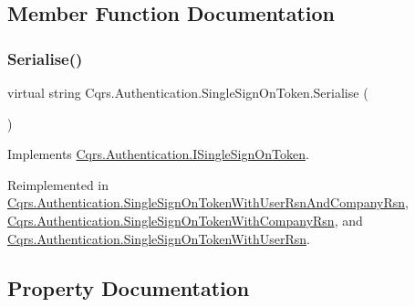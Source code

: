 \subsection{Member Function Documentation}
\mbox{\label{classCqrs_1_1Authentication_1_1SingleSignOnToken_a5e859c6c5db5aaa9ef4e8f2086df4604}} 
\subsubsection{\texorpdfstring{Serialise()}{Serialise()}}
{\footnotesize\ttfamily virtual string Cqrs.\+Authentication.\+Single\+Sign\+On\+Token.\+Serialise (\begin{DoxyParamCaption}{ }\end{DoxyParamCaption})\hspace{0.3cm}{\ttfamily [virtual]}}



Implements \hyperlink{interfaceCqrs_1_1Authentication_1_1ISingleSignOnToken_af34e8c0b052865d687064d3381bfbcdb}{Cqrs.\+Authentication.\+I\+Single\+Sign\+On\+Token}.



Reimplemented in \hyperlink{classCqrs_1_1Authentication_1_1SingleSignOnTokenWithUserRsnAndCompanyRsn_a8d44249c00e5264dc7b37f4868836a80}{Cqrs.\+Authentication.\+Single\+Sign\+On\+Token\+With\+User\+Rsn\+And\+Company\+Rsn}, \hyperlink{classCqrs_1_1Authentication_1_1SingleSignOnTokenWithCompanyRsn_a0bc9f0fae90121d029fe0730708f4210}{Cqrs.\+Authentication.\+Single\+Sign\+On\+Token\+With\+Company\+Rsn}, and \hyperlink{classCqrs_1_1Authentication_1_1SingleSignOnTokenWithUserRsn_a8103820e6352c10b3990fb027dd9b5ae}{Cqrs.\+Authentication.\+Single\+Sign\+On\+Token\+With\+User\+Rsn}.



\subsection{Property Documentation}
\mbox{\label{classCqrs_1_1Authentication_1_1SingleSignOnToken_aa0ea2d0654dd2aab23af98806663cd7c}} 
